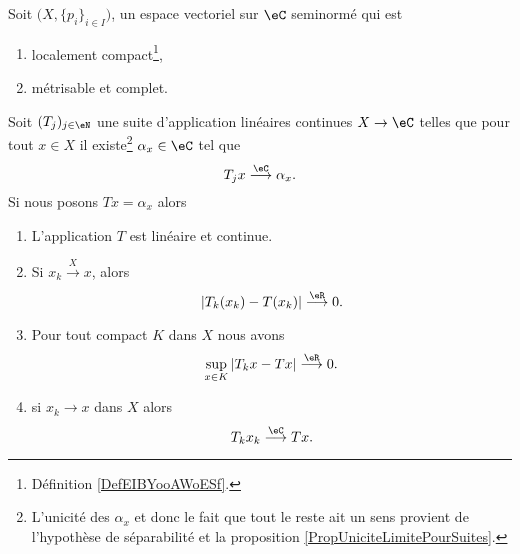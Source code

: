 \begin{corollary}   \label{CorPGwLluz}
    Soit \( \big( X, \{ p_i \}_{i\in I} \big)\), un espace vectoriel sur \( \eC\) seminormé qui est
    \begin{enumerate}
        \item
            localement compact\footnote{Définition \ref{DefEIBYooAWoESf}.},
        \item
            métrisable et complet.
    \end{enumerate}
    Soit \( (T_j)_{j\in \eN}\) une suite d'application linéaires continues \( X\to \eC\) telles que pour tout \( x\in X\) il existe\footnote{L'unicité des \( \alpha_x\) et donc le fait que tout le reste ait un sens provient de l'hypothèse de séparabilité et la proposition \ref{PropUniciteLimitePourSuites}.} \( \alpha_x\in \eC\) tel que
    \begin{equation}
        T_jx\stackrel{\eC}{\longrightarrow}\alpha_x.
    \end{equation}
    Si nous posons \( Tx=\alpha_x\) alors
    \begin{enumerate}
        \item   \label{ItemAEOtOMLi}
            L'application \( T\) est linéaire et continue.
        \item       \label{ITEMooEVIXooBpaWOc}
            Si \( x_k\stackrel{X}{\longrightarrow}x\), alors
            \begin{equation}
                | T_k(x_k)-T(x_k) |\stackrel{\eR}{\longrightarrow}0.
            \end{equation}
        \item       \label{ITEMooJYOVooPIkHBo}
            Pour tout compact \( K\) dans \( X\) nous avons
            \begin{equation}
                \sup_{x\in K}|T_kx-Tx|\stackrel{\eR}{\longrightarrow}0.
            \end{equation}
        \item   \label{ItemAEOtOMLiii}
            si \( x_k\to x\) dans \( X\) alors
            \begin{equation}
                T_kx_k\stackrel{\eC}{\longrightarrow} Tx.
            \end{equation}
    \end{enumerate}
\end{corollary}

